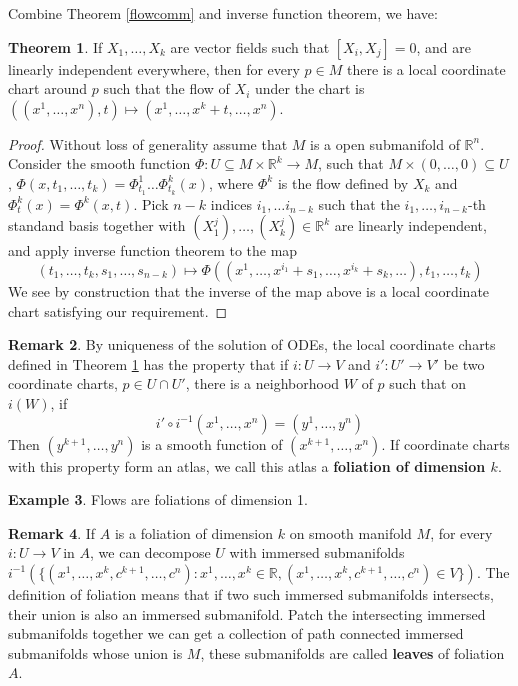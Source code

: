 \documentclass{article}
\theoremstyle{definition}
\newtheorem{thm}{Theorem}[section]
\newtheorem{rmk}[thm]{Remark}
\newtheorem{exm}[thm]{Example}
\begin{document}
    Combine Theorem \ref{flowcomm} and inverse function theorem, we have:
    \begin{thm}\label{commfoli}
      If $X_1, \dots, X_k$ are vector fields such that $[X_i, X_j]=0$, and are linearly independent everywhere, then for every $p\in M$ there is a local coordinate chart around $p$ such that the flow of $X_i$ under the chart is $((x^1, \dots, x^n), t)\mapsto (x^1, \dots, x^k+t, \dots, x^n)$.
    \end{thm}
    \begin{proof}
        Without loss of generality assume that $M$ is a open submanifold of $\mathbb{R}^n$. Consider the smooth function $\Phi: U\subseteq M\times \mathbb{R}^k\rightarrow M$, such that $M\times (0, \dots, 0)\subseteq U$, $\Phi(x, t_1, \dots, t_k)=\Phi^1_{t_1}\dots \Phi^k_{t_k}(x)$, where $\Phi^k$ is the flow defined by $X_k$ and $\Phi^k_t(x)=\Phi^k(x, t)$. Pick $n-k$ indices $i_1, \dots i_{n-k}$ such that the $i_1, \dots, i_{n-k}$-th standand basis together with $(X_1^j), \dots, (X_k^j)\in\mathbb{R}^k$ are linearly independent, and apply inverse function theorem to the map
        \[(t_1, \dots, t_k, s_1, \dots, s_{n-k})\mapsto \Phi((x^1, \dots, x^{i_1}+s_1, \dots, x^{i_k}+s_k, \dots), t_1, \dots, t_k)\]
        We see by construction that the inverse of the map above is a local coordinate chart satisfying our requirement.
    \end{proof}
    
\begin{rmk}\label{folrmk}
    By uniqueness of the solution of ODEs, the local coordinate charts defined in Theorem \ref{commfoli} has the property that if $i: U\rightarrow V$ and $i': U'\rightarrow V'$ be two coordinate charts, $p\in U\cap U'$, there is a neighborhood $W$ of $p$ such that on $i(W)$, if
    \[i'\circ i^{-1}(x^1, \dots, x^n)=(y^1, \dots, y^n)\]
    Then $(y^{k+1}, \dots, y^n)$ is a smooth function of $(x^{k+1}, \dots, x^n)$. If coordinate charts with this property form an atlas, we call this atlas a {\bf foliation of dimension $k$}.
\end{rmk}

\begin{exm}
    Flows are foliations of dimension 1. 
\end{exm}

\begin{rmk}
    If $A$ is a foliation of dimension $k$ on smooth manifold $M$, for every $i: U\rightarrow V$ in $A$, we can decompose $U$ with immersed submanifolds $i^{-1}(\{(x^1, \dots, x^k, c^{k+1}, \dots, c^n): x^1, \dots, x^k\in\mathbb{R}, (x^1, \dots, x^k, c^{k+1}, \dots, c^n)\in V\})$. The definition of foliation means that if two such immersed submanifolds intersects, their union is also an immersed submanifold. Patch the intersecting immersed submanifolds together we can get a collection of path connected immersed submanifolds whose union is $M$, these submanifolds are called {\bf leaves} of foliation $A$. 
\end{rmk}
\end{document}
